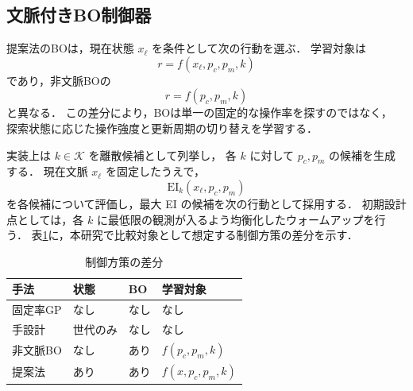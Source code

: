 \documentclass[a4paper,10pt,twocolumn]{ltjsarticle}
\newcommand{\EI}{\mathrm{EI}}
\begin{document}
\subsection{文脈付きBO制御器}

提案法のBOは，現在状態 \(x_\ell\) を条件として次の行動を選ぶ．
学習対象は
\begin{equation}
r=f(x_\ell,p_c,p_m,k)
\end{equation}
であり，非文脈BOの
\begin{equation}
r=f(p_c,p_m,k)
\end{equation}
と異なる．
この差分により，BOは単一の固定的な操作率を探すのではなく，
探索状態に応じた操作強度と更新周期の切り替えを学習する．

実装上は \(k\in\mathcal{K}\) を離散候補として列挙し，
各 \(k\) に対して \(p_c,p_m\) の候補を生成する．
現在文脈 \(x_\ell\) を固定したうえで，
\[
\EI_k(x_\ell,p_c,p_m)
\]
を各候補について評価し，最大 EI の候補を次の行動として採用する．
初期設計点としては，各 \(k\) に最低限の観測が入るよう均衡化したウォームアップを行う．
表\ref{tab:method-diff}に，本研究で比較対象として想定する制御方策の差分を示す．

\begin{table}[tb]
\centering
\caption{制御方策の差分}
\label{tab:method-diff}
\small
\begin{tabular}{@{}llll@{}}
\toprule
手法 & 状態 & BO & 学習対象 \\
\midrule
固定率GP & なし & なし & なし \\
手設計 & 世代のみ & なし & なし \\
非文脈BO & なし & あり & \(f(p_c,p_m,k)\) \\
提案法 & あり & あり & \(f(x,p_c,p_m,k)\) \\
\bottomrule
\end{tabular}
\end{table}
\end{document}

